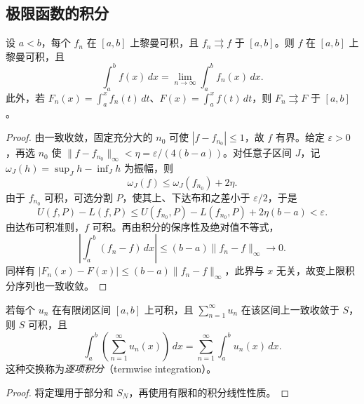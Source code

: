 \subsection{极限函数的积分}
\label{subsec:integration-of-limit-functions}

\begin{theorem}[一致极限的可积性与积分极限]
\label{thm:integration-of-uniform-limit}
设 $a<b$，每个 $f_n$ 在 $[a,b]$ 上黎曼可积，且 $f_n\rightrightarrows f$ 于 $[a,b]$。则 $f$ 在 $[a,b]$ 上黎曼可积，且
\begin{equation}
    \int_a^bf(x)\,dx
       =\lim_{n\to\infty}\int_a^bf_n(x)\,dx.
    \label{eq:uniform-limit-integration}
\end{equation}
此外，若 $F_n(x)=\int_a^xf_n(t)\,dt$、$F(x)=\int_a^xf(t)\,dt$，则 $F_n\rightrightarrows F$ 于 $[a,b]$。
\end{theorem}

\begin{proof}
由一致收敛，固定充分大的 $n_0$ 可使 $|f-f_{n_0}|\leq1$，故 $f$ 有界。给定 $\varepsilon>0$，再选 $n_0$ 使 $\|f-f_{n_0}\|_\infty<\eta=\varepsilon/(4(b-a))$。对任意子区间 $J$，记 $\omega_J(h)=\sup_Jh-\inf_Jh$ 为振幅，则
\[
    \omega_J(f)\leq\omega_J(f_{n_0})+2\eta.
\]
由于 $f_{n_0}$ 可积，可选分割 $P$，使其上、下达布和之差小于 $\varepsilon/2$，于是
\[
    U(f,P)-L(f,P)
    \leq U(f_{n_0},P)-L(f_{n_0},P)+2\eta(b-a)<\varepsilon.
\]
由达布可积准则，$f$ 可积。再由积分的保序性及绝对值不等式，
\begin{equation}
    \left|\int_a^b(f_n-f)\,dx\right|
       \leq(b-a)\|f_n-f\|_\infty\longrightarrow0.
    \label{eq:uniform-integral-error-bound}
\end{equation}
同样有 $|F_n(x)-F(x)|\leq(b-a)\|f_n-f\|_\infty$，此界与 $x$ 无关，故变上限积分序列也一致收敛。
\end{proof}

\begin{corollary}[逐项积分]
\label{cor:termwise-integration-uniform-series}
若每个 $u_n$ 在有限闭区间 $[a,b]$ 上可积，且 $\sum_{n=1}^\infty u_n$ 在该区间上一致收敛于 $S$，则 $S$ 可积，且
\begin{equation}
    \int_a^b\left(\sum_{n=1}^\infty u_n(x)\right)\,dx
       =\sum_{n=1}^\infty\int_a^bu_n(x)\,dx.
    \label{eq:uniform-series-termwise-integration}
\end{equation}
这种交换称为\emph{逐项积分}（termwise integration）。
\end{corollary}

\begin{proof}
将定理用于部分和 $S_N$，再使用有限和的积分线性性质。
\end{proof}

